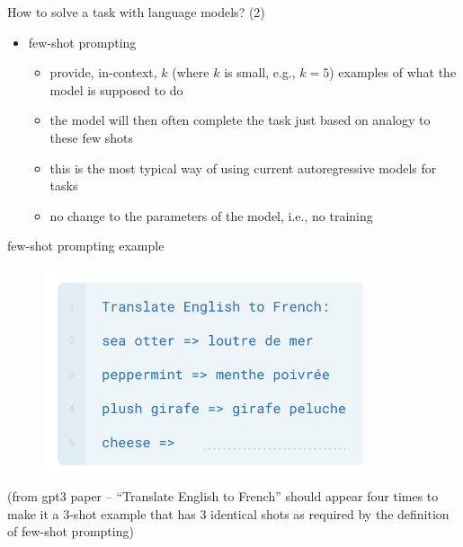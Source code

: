 \begin{frame}{How to solve a task with language models? (2)}

\vfill

\begin{itemize}
    \item few-shot prompting
        \begin{itemize}
            \item provide, in-context,  $k$ (where $k$ is small, e.g., $k=5$) examples of what the model is
supposed to do
        \item the model will then often complete the task
        just based on analogy to these few shots
        \item this is the most typical way of using current
        autoregressive models for tasks
\item no change to the parameters of the model, i.e., no training
\end{itemize}
\end{itemize}

\vfill

\end{frame}

\begin{frame}{few-shot prompting example}

\vfill
	
	\begin{figure}
		\centering
		\includegraphics[height = 6cm]{figure/fewshotprompting} 
	\end{figure}

(from gpt3 paper -- ``Translate English to French'' should
appear four times to make it a 3-shot example that has 3
identical shots as required by the definition of few-shot prompting)

\vfill

\end{frame}


